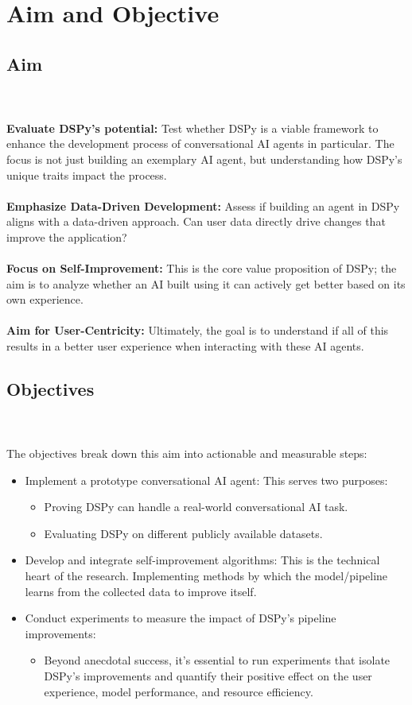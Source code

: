 \chapter{Aim and Objective}
\section{Aim}\\
\\
\textbf{Evaluate DSPy's potential:} Test whether DSPy is a viable framework to enhance the development process of conversational AI agents in particular. The focus is not just building an exemplary AI agent, but understanding how DSPy's unique traits impact the process.\\
\\
\textbf{Emphasize Data-Driven Development:} Assess if building an agent in DSPy aligns with a data-driven approach. Can user data directly drive changes that improve the application?\\
\\
\textbf{Focus on Self-Improvement:} This is the core value proposition of DSPy; the aim is to analyze whether an AI built using it can actively get better based on its own experience.\\
\\
\textbf{Aim for User-Centricity:} Ultimately, the goal is to understand if all of this results in a better user experience when interacting with these AI agents.
\section{Objectives}\\
\\
The objectives break down this aim into actionable and measurable steps:
\begin{itemize}
    \item Implement a prototype conversational AI agent: This serves two purposes:
    \begin{itemize}
        \item Proving DSPy can handle a real-world conversational AI task.
        \item Evaluating DSPy on different publicly available datasets.
    \end{itemize}
    \item Develop and integrate self-improvement algorithms: This is the technical heart of the research. Implementing methods by which the model/pipeline learns from the collected data to improve itself.
    \item Conduct experiments to measure the impact of DSPy's pipeline improvements:
    \begin{itemize}
        \item Beyond anecdotal success, it's essential to run experiments that isolate DSPy's improvements and quantify their positive effect on the user experience, model performance, and resource efficiency. 
    \end{itemize}
\end{itemize}
